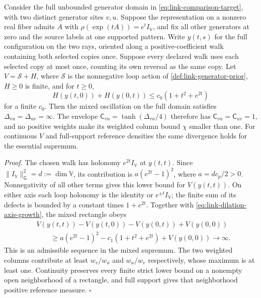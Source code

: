 Consider the full unbounded generator domain in
\cref{eq:link-comparison-target}, with two distinct generator sites $v,u$.
Suppose the representation on a nonzero real fiber admits $A$ with
$\rho(\exp(tA))=e^tI_{\mathbb V}$, and fix all other generators at zero and
the source labels at one supported pattern. Write $y(t,s)$ for the full
configuration on the two rays, oriented along a positive-coefficient walk
containing both selected copies once. Suppose every declared walk uses each
selected copy at most once, counting its own reversal as the same copy.
Let $V=\mathscr S+H$, where $\mathscr S$ is the nonnegative loop action of
\cref{def:link-generator-prior}, $H\ge0$ is finite, and for $t\ge0$,
\begin{equation}
H(y(t,0))+H(y(0,t))\le c_0(1+t^2+e^{2t})
\label{eq:link-dilation-axis-growth}
\end{equation}
for a finite $c_0$. Then the mixed oscillation on the full domain satisfies
$\Delta_{vu}=\Delta_{uv}=\infty$. The envelope
$\mathsf C_{vu}=\tanh(\Delta_{vu}/4)$ therefore has
$\mathsf C_{vu}=\mathsf C_{uv}=1$, and no positive weights make its weighted
column bound $\chi$ smaller than one. For continuous $V$ and full-support
reference densities the same divergence holds for the essential supremum.

\noindent\emph{Proof.}
The chosen walk has holonomy $e^{2t}I_{\mathbb V}$ at $y(t,t)$. Since
$\|I_{\mathbb V}\|_{\mathsf G}^2=d:=\dim\mathbb V$, its contribution is
$a(e^{2t}-1)^2$, where $a=d c_p/2>0$. Nonnegativity of all other terms gives
this lower bound for $V(y(t,t))$. On either axis each loop holonomy is the
identity or $e^{\pm t}I_{\mathbb V}$; the finite sum of its defects is bounded
by a constant times $1+e^{2t}$. Together with
\cref{eq:link-dilation-axis-growth}, the mixed rectangle obeys
\begin{equation}
\begin{split}
&V(y(t,t))-V(y(t,0))-V(y(0,t))+V(y(0,0))\\
&\qquad\ge a(e^{2t}-1)^2-c_1(1+t^2+e^{2t})+V(y(0,0))\longrightarrow\infty.
\end{split}
\end{equation}
This is an admissible sequence in the mixed supremum. The two weighted
columns contribute at least $w_v/w_u$ and $w_u/w_v$ respectively, whose
maximum is at least one. Continuity preserves every finite strict lower
bound on a nonempty open neighborhood of a rectangle, and full support gives
that neighborhood positive reference measure. $\square$

